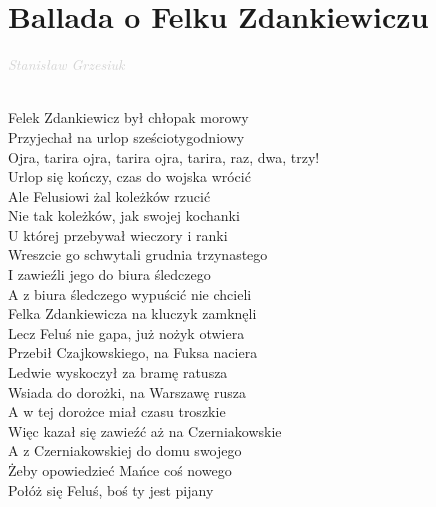 \documentclass[a5paper, 10pt]{book}
\begin{document}
\newpage
\section{Ballada o Felku Zdankiewiczu}\textcolor{lightgray}{\textit{Stanisław Grzesiuk}}\\~\\
\begin{minipage}[t]{0.8\textwidth}
Felek Zdankiewicz był chłopak morowy\\
Przyjechał na urlop sześciotygodniowy\vspace*{2.2mm}\\
\hspace*{5mm}Ojra, tarira ojra, tarira ojra, tarira, raz, dwa, trzy!\vspace*{2.2mm}\\
Urlop się kończy, czas do wojska wrócić\\
Ale Felusiowi żal koleżków rzucić\vspace*{1.8mm}\\
Nie tak koleżków, jak swojej kochanki\\
U której przebywał wieczory i ranki\vspace*{1.8mm}\\
Wreszcie go schwytali grudnia trzynastego\\
I zawieźli jego do biura śledczego\vspace*{1.8mm}\\
A z biura śledczego wypuścić nie chcieli\\
Felka Zdankiewicza na kluczyk zamknęli\vspace*{1.8mm}\\
Lecz Feluś nie gapa, już nożyk otwiera\\
Przebił Czajkowskiego, na Fuksa naciera\vspace*{1.8mm}\\
Ledwie wyskoczył za bramę ratusza\\
Wsiada do dorożki, na Warszawę rusza\vspace*{1.8mm}\\
A w tej dorożce miał czasu troszkie\\
Więc kazał się zawieźć aż na Czerniakowskie\vspace*{1.8mm}\\
A z Czerniakowskiej do domu swojego\\
Żeby opowiedzieć Mańce coś nowego\vspace*{1.8mm}\\
Połóż się Feluś, boś ty jest pijany\\

\end{minipage}
\end{document}

